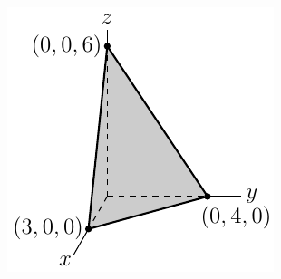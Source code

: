 \begin{eg}
\begin{efig}
\begin{center}
   \includegraphics{planeSketch.pdf}
\end{center}
\end{efig}
\end{eg}

